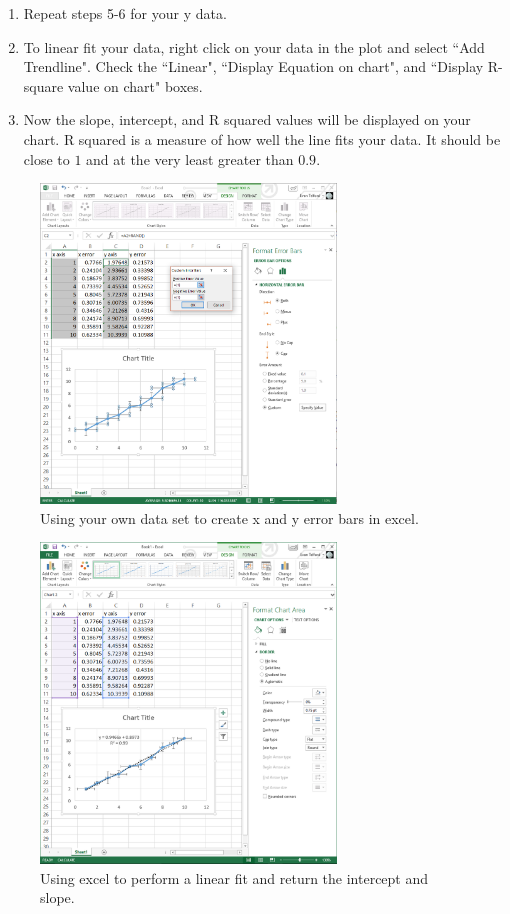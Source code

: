 \begin{enumerate}
\item Repeat steps 5-6 for your y data.
\item To linear fit your data, right click on your data in the plot and select ``Add Trendline". Check the ``Linear", ``Display Equation on chart", and ``Display R-square value on chart" boxes.
\item Now the slope, intercept, and R squared values will be displayed on your chart. R squared is a measure of how well the line fits your data. It should be close to $1$ and at the very least greater than $0.9$.
\end{enumerate}

\begin{figure}[h!]
\centering
\includegraphics[height=0.4\textheight, width=0.7\textwidth]{./Exp1/pic/image5.png}
\caption{Using your own data set to create x and y error bars in excel.}
\label{fig:excel2}
\end{figure}

\begin{figure}[h!]
\centering
\includegraphics[height=0.4\textheight, width = 0.7\textwidth]{./Exp1/pic/image6.png}
\caption{Using excel to perform a linear fit and return the intercept and slope.}
\label{fig:excel3}
\end{figure}

